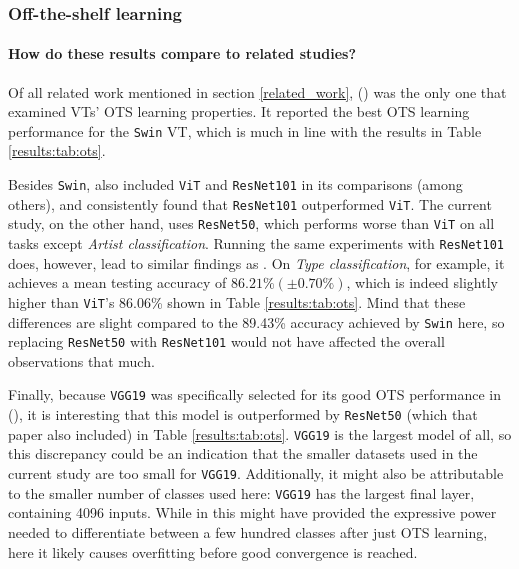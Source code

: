 \subsubsection{Off-the-shelf learning}

\paragraph{How do these results compare to related studies?}
Of all related work mentioned in section \ref{related_work}, \citeauthor{zhou2021convnets} (\citeyear{zhou2021convnets}) was the only one that examined VTs' OTS learning properties. It reported the best OTS learning performance for the \texttt{Swin} VT, which is much in line with the results in Table \ref{results:tab:ots}.

Besides \texttt{Swin}, \citeauthor{zhou2021convnets} also included \texttt{ViT} and \texttt{ResNet101} in its comparisons (among others), and consistently found that \texttt{ResNet101} outperformed \texttt{ViT}. The current study, on the other hand, uses \texttt{ResNet50}, which performs worse than \texttt{ViT} on all tasks except \textit{Artist classification}. Running the same experiments with \texttt{ResNet101} does, however, lead to similar findings as \citeauthor{zhou2021convnets}. On \textit{Type classification}, for example, it achieves a mean testing accuracy of  $86.21\% (\pm 0.70\%)$, which is indeed slightly higher than \texttt{ViT}'s 86.06\% shown in Table \ref{results:tab:ots}. Mind that these differences are slight compared to the 89.43\% accuracy achieved by \texttt{Swin} here, so replacing \texttt{ResNet50} with \texttt{ResNet101} would not have affected the overall observations that much.

Finally, because \texttt{VGG19} was specifically selected for its good OTS performance in \citeauthor{sabatelli2018deep} (\citeyear{sabatelli2018deep}), it is interesting that this model is outperformed by \texttt{ResNet50} (which that paper also included) in Table \ref{results:tab:ots}. \texttt{VGG19} is the largest model of all, so this discrepancy could be an indication that the smaller datasets used in the current study are too small for \texttt{VGG19}. Additionally, it might also be attributable to the smaller number of classes used here: \texttt{VGG19} has the largest final layer, containing 4096 inputs. While in \citeauthor{sabatelli2018deep} this might have provided the expressive power needed to differentiate between a few hundred classes after just OTS learning, here it likely causes overfitting before good convergence is reached.

